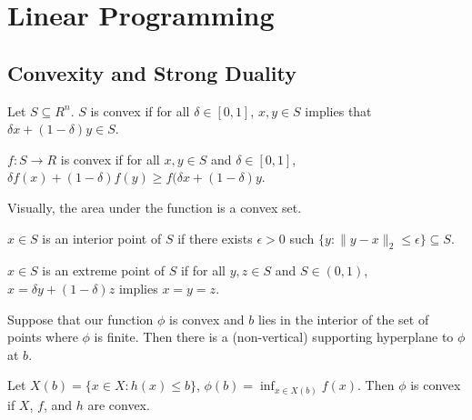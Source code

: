 
\chapter{Linear Programming}
\label{cha:linear-programming}

\section{Convexity and Strong Duality}
\label{sec:conv-strong-dual-1}


\begin{defn}
  \label{defn:linear_programming:1}
  Let $S \subseteq R^{n}$.  $S$ is convex if for all $\delta \in [0,
  1]$, $x, y \in S$ implies that $\delta x + (1 - \delta) y \in S$.

  $f: S \rightarrow R$ is convex if for all $x, y \in S$ and $\delta
  \in [0, 1]$, $\delta f(x) + (1-\delta) f(y) \geq f(\delta x + (1 -
  \delta)y$.

  Visually, the area under the function is a convex set.
\end{defn}

\begin{defn}
  \label{defn:linear_programming:2}
  $x \in S$ is an interior point of $S$ if there exists $\epsilon > 0$
  such $\{ y: \| y - x \|_{2} \leq \epsilon \} \subseteq S$.
  
  $x \in S$ is an extreme point of $S$ if for all $y, z \in S$ and $S
  \in (0, 1)$, $x = \delta y + (1 - \delta) z$ implies $x = y = z$.
\end{defn}

\begin{thm}
  \label{thm:linear_programming:supporting-hyperplane}
  Suppose that our function $\phi$ is convex and $b$ lies in the
  interior of the set of points where $\phi$ is finite.
  Then there is a (non-vertical) supporting hyperplane to $\phi$ at
  $b$.
\end{thm}

\begin{thm}
  Let $X(b) = \{ x \in X : h(x) \leq b \}$, $\phi(b) = \inf_{x \in
    X(b)} f(x)$.  Then $\phi$ is convex if $X$, $f$, and $h$ are convex.
\end{thm}

